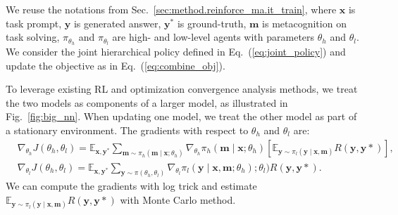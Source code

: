 We reuse the notations from Sec.~\ref{sec:method.reinforce_ma.it_train}, where $\mathbf{x}$ is task prompt, $\mathbf{y}$ is generated answer, $\mathbf{y}^*$ is ground-truth, $\mathbf{m}$ is metacognition on task solving, $\pi_{\theta_h}$ and $\pi_{\theta_l}$ are high- and low-level agents with parameters $\theta_h$ and $\theta_l$. We consider the joint hierarchical policy defined in Eq.~(\ref{eq:joint_policy}) and update the objective as in Eq.~(\ref{eq:combine_obj}).

To leverage existing RL and optimization convergence analysis methods, we treat the two models as components of a larger model, as illustrated in Fig.~\ref{fig:big_nn}. 
When updating one model, we treat the other model as part of a stationary environment. The gradients with respect to $\theta_h$ and $\theta_l$ are:
\begin{align*}
&\nabla_{\theta_h} J(\theta_h, \theta_l) = \mathbb{E}_{\mathbf{x}, \mathbf{y}^*} \sum_{\mathbf{m}\sim \pi_h(\mathbf{m}\mid\mathbf{x}; \theta_h)} \nabla_{\theta_h}\pi_h(\mathbf{m}\mid\mathbf{x}; \theta_h) \left[\mathbb{E}_{\mathbf{y} \sim \pi_l(\mathbf{y} \mid \mathbf{x}, \mathbf{m})} R(\mathbf{y}, \mathbf{y}*)\right], \\
&\nabla_{\theta_l} J(\theta_h, \theta_l) = \mathbb{E}_{\mathbf{x}, \mathbf{y}^*} \sum_{\mathbf{y}\sim \pi(\theta_h, \theta_l)} \nabla_{\theta_l}\pi_l(\mathbf{y} \mid \mathbf{x}, \mathbf{m}; \theta_h); \theta_l) R(\mathbf{y}, \mathbf{y}*).
\end{align*}
We can compute the gradients with log trick and estimate $\mathbb{E}_{\mathbf{y} \sim \pi_l(\mathbf{y} \mid \mathbf{x}, \mathbf{m})} R(\mathbf{y}, \mathbf{y}*)$ with Monte Carlo method.

